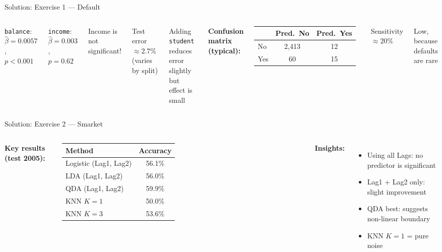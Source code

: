 \documentclass[aspectratio=169, 11pt]{beamer}
\begin{document}
\begin{frame}{Solution: Exercise 1 --- Default}
\begin{columns}
\texttt{balance}: $\hat{\beta} = 0.0057$, $p < 0.001$

\texttt{income}: $\hat{\beta} = 0.003$, $p = 0.62$

\textcolor{softred}{Income is not significant!}

\vspace{0.3em}
Test error $\approx 2.7\%$ (varies by split)

\vspace{0.3em}
Adding \texttt{student} reduces error slightly\\
but effect is small

\textbf{Confusion matrix (typical):}

\vspace{0.3em}
\begin{tabular}{lcc}
\toprule
 & Pred.\ No & Pred.\ Yes \\
\midrule
No & 2,413 & 12 \\
Yes & 60 & 15 \\
\bottomrule
\end{tabular}

\vspace{0.3em}
Sensitivity $\approx 20\%$

\footnotesize Low, because defaults are rare
\end{columns}
\end{frame}


\begin{frame}{Solution: Exercise 2 --- Smarket}
\begin{columns}
\textbf{Key results (test 2005):}

\begin{tabular}{lc}
\toprule
Method & Accuracy \\
\midrule
Logistic (Lag1, Lag2) & 56.1\% \\
LDA (Lag1, Lag2) & 56.0\% \\
\textcolor{softgreen}{QDA (Lag1, Lag2)} & \textcolor{softgreen}{59.9\%} \\
KNN $K=1$ & 50.0\% \\
KNN $K=3$ & 53.6\% \\
\bottomrule
\end{tabular}

\textbf{Insights:}

\begin{itemize}
  \item Using all Lags: no predictor is significant
  \item Lag1 + Lag2 only: slight improvement
  \item QDA best: suggests non-linear boundary
  \item KNN $K=1$ = pure noise
\end{itemize}
\end{columns}
\end{frame}
\end{document}
